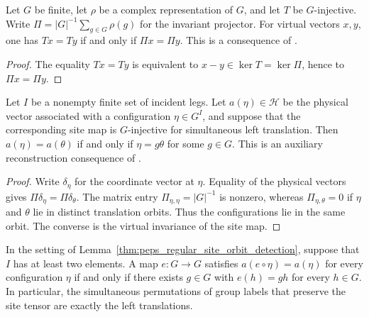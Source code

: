 \begin{lemma}%
    \label{thm:peps_g_injective_image_equality}
    \leanok
    Let $G$ be finite, let $\rho$ be a complex representation of $G$,
    and let $T$ be $G$-injective. Write
    $\Pi=|G|^{-1}\sum_{g\in G}\rho(g)$ for the invariant projector.
    For virtual vectors $x,y$, one has $Tx=Ty$ if and only if
    $\Pi x=\Pi y$. This is a consequence of
    \cite[Definition~5.1]{Schuch2010PEPS}.
\end{lemma}

\begin{proof}\leanok
    The equality $Tx=Ty$ is equivalent to
    $x-y\in\ker T=\ker\Pi$, hence to $\Pi x=\Pi y$.
\end{proof}

\begin{lemma}%
    \label{thm:peps_regular_site_orbit_detection}
    \leanok
    Let $I$ be a nonempty finite set of incident legs. Let
    $a(\eta)\in\mathcal H$ be the physical vector associated with a
    configuration $\eta\in G^I$, and suppose that the corresponding
    site map is $G$-injective for simultaneous left translation.
    Then $a(\eta)=a(\theta)$ if and only if
    $\eta=g\theta$ for some $g\in G$. This is an auxiliary
    reconstruction consequence of
    \cite[Definition~5.1]{Schuch2010PEPS}.
\end{lemma}

\begin{proof}\leanok
    Write $\delta_\eta$ for the coordinate vector at $\eta$.
    Equality of the physical vectors gives
    $\Pi\delta_\eta=\Pi\delta_\theta$. The matrix entry
    $\Pi_{\eta,\eta}=|G|^{-1}$ is nonzero, whereas
    $\Pi_{\eta,\theta}=0$ if $\eta$ and $\theta$ lie in distinct
    translation orbits. Thus the configurations lie in the same
    orbit. The converse is the virtual invariance of the site map.
\end{proof}

\begin{lemma}%
    \label{thm:peps_regular_site_permutation_recovery}
    \leanok
    In the setting of Lemma~\ref{thm:peps_regular_site_orbit_detection},
    suppose that $I$ has at least two elements. A map $e:G\to G$
    satisfies $a(e\circ\eta)=a(\eta)$ for every configuration $\eta$
    if and only if there exists $g\in G$ with $e(h)=gh$ for every
    $h\in G$. In particular, the simultaneous permutations of
    group labels that preserve the site tensor are exactly the
    left translations.
\end{lemma}

